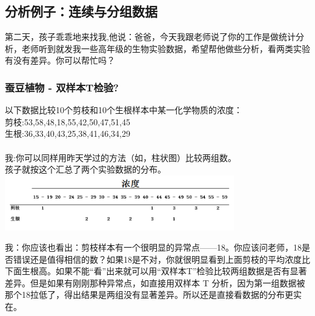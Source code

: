 
\hypertarget{ux5982ux4f55ux753bux830eux53f6ux56festem-and-leaf-plot}{%
\subsection{分析例子：连续与分组数据}\label{ux5982ux4f55ux753bux830eux53f6ux56festem-and-leaf-plot}}

第二天，孩子乖乖地来找我,他说：爸爸，今天我跟老师说了你的工作是做统计分析，老师听到就发我一些高年级的生物实验数据，希望帮他做些分析，看两类实验有没有差异。你可以帮忙吗？\\

\hypertarget{ux8695ux8c46ux690dux7269---ux53ccux6837ux672ctux68c0ux9a8c}{%
\subsubsection{蚕豆植物 -
双样本T检验?}\label{ux8695ux8c46ux690dux7269---ux53ccux6837ux672ctux68c0ux9a8c}}

以下数据比较10个剪枝和10个生根样本中某一化学物质的浓度：\\
剪枝:53,58,48,18,55,42,50,47,51,45\\
生根:36,33,40,43,25,38,41,46,34,29\\
~\\
我:你可以同样用昨天学过的方法（如，柱状图）比较两组数。\\
孩子就按这个汇总了两个实验数据的分布。\\


\includegraphics[width=10cm]{图片61-11.png}

我：你应该也看出：剪枝样本有一个很明显的异常点——18。你应该问老师，18是否错误还是值得相信的数？如果18是不对，你就很明显看到上面剪枝的平均浓度比下面生根高。如果不能“看”出来就可以用“双样本T”检验比较两组数据是否有显著差异。但是如果有刚刚那种异常点，如直接用双样本 T 分析，因为第一组数据被那个18拉低了，得出结果是两组没有显著差异。所以还是直接看数据的分布更实在。\\

